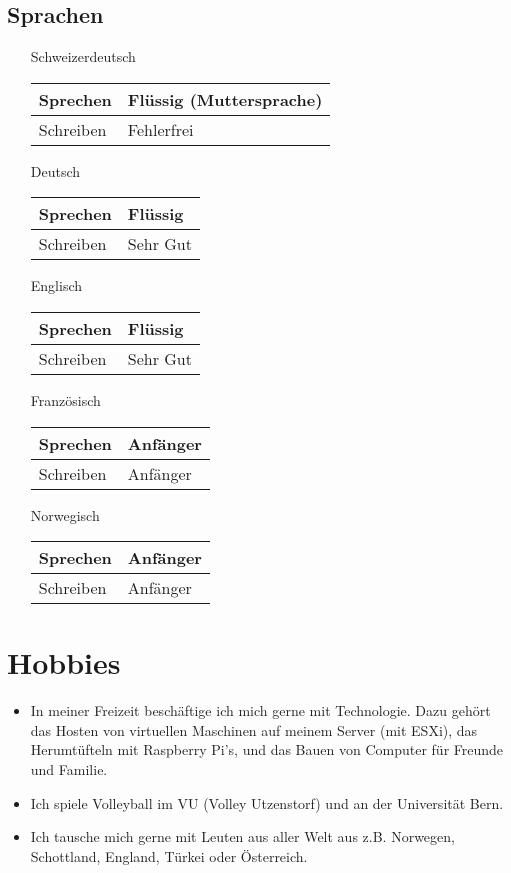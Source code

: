 \documentclass{article}
\begin{document}
\subsection{Sprachen}
\begin{itemize}[leftmargin=3cm, labelsep = 0.5cm ]
    \item[Schweizerdeutsch]
    \begin{tabular}{| m{5em} | m{12em}}
        Sprechen& Fl\"ussig (Muttersprache)\\
        \hline
        Schreiben  & Fehlerfrei\\
      \end{tabular}\newline
    \item[Deutsch]
    \begin{tabular}{| m{5em} | m{12em}}
        Sprechen & Fl\"ussig\\
        \hline
        Schreiben & Sehr Gut\\
    \end{tabular}
    \item[Englisch]
    \begin{tabular}{| m{5em} | m{12em}}
        Sprechen & Fl\"ussig\\
        \hline
        Schreiben & Sehr Gut\\
    \end{tabular}
    \item[Französisch]
    \begin{tabular}{| m{5em} | m{12em}}
        Sprechen & Anf\"anger\\
        \hline
        Schreiben & Anf\"anger\\
    \end{tabular}
    \item[Norwegisch]
    \begin{tabular}{| m{5em} | m{12em}}
        Sprechen & Anf\"anger\\
        \hline
        Schreiben & Anf\"anger\\
    \end{tabular}
\end{itemize}

\section{Hobbies}
\begin{itemize}
    \item In meiner Freizeit besch\"aftige ich mich gerne mit Technologie. 
    Dazu geh\"ort das Hosten von virtuellen Maschinen auf meinem Server (mit ESXi),
     das Herumt\"ufteln mit Raspberry Pi's, 
    und das Bauen von Computer f\"ur Freunde und Familie.
    \item Ich spiele Volleyball im VU (Volley Utzenstorf) und an der Universit\"at Bern.
    \item Ich tausche mich gerne mit Leuten aus aller Welt aus z.B. 
    Norwegen, Schottland, England, T\"urkei oder \"Osterreich.
\end{itemize}
\end{document}
